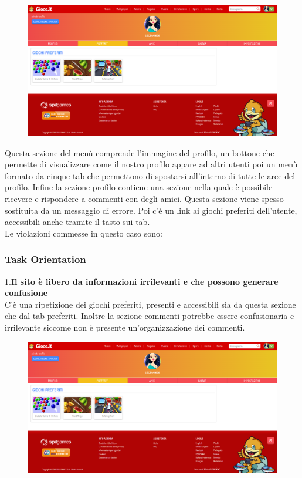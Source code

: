 \documentclass[../Report.tex]{subfiles}
\begin{document}
    \begin{figure}[H]
        \includegraphics[width=\linewidth]{Assestment14.png}
        \centering
    \end{figure}
    Questa sezione del menù comprende l’immagine del profilo, un bottone che permette di visualizzare come il nostro profilo appare ad altri utenti poi un menù formato da cinque tab che permettono di spostarsi all’interno di tutte le aree del profilo. Infine la sezione profilo contiene una sezione nella quale è possibile ricevere e rispondere a commenti con degli amici. Questa sezione viene spesso sostituita da un messaggio di errore. Poi c’è un link ai giochi preferiti dell’utente, accessibili anche tramite il tasto sui tab. \\
    Le violazioni commesse in questo caso sono: \\

    \subsubsection{Task Orientation}
    1.\textbf{Il sito è libero da informazioni irrilevanti e che possono generare confusione}\\
        C'è una ripetizione dei giochi preferiti, presenti e accessibili sia da questa sezione che dal tab preferiti. Inoltre la sezione commenti potrebbe essere confusionaria e irrilevante siccome non è presente un'organizzazione dei commenti.\\

    \begin{figure}[H]
        \includegraphics[width=\linewidth]{Assestment14.png}
        \centering
    \end{figure}
\end{document}

